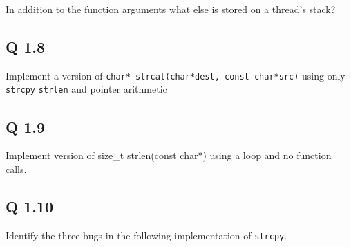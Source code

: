 In addition to the function arguments what else is stored on a thread's
stack?

\subsection{Q 1.8}\label{q-1.8}

Implement a version of
\texttt{char*\ strcat(char*dest,\ const\ char*src)} using only
\texttt{strcpy} \texttt{strlen} and pointer arithmetic

\begin{Shaded}
\begin{Highlighting}[]
 


   
\NormalTok{\}}
\end{Highlighting}
\end{Shaded}

\subsection{Q 1.9}\label{q-1.9}

Implement version of size\_t strlen(const char*) using a loop and no
function calls.

\begin{Shaded}
\begin{Highlighting}[]
 

\NormalTok{\}}
\end{Highlighting}
\end{Shaded}

\subsection{Q 1.10}\label{q-1.10}

Identify the three bugs in the following implementation of
\texttt{strcpy}.

\begin{Shaded}
\begin{Highlighting}[]
  
   
\NormalTok{\}}
\end{Highlighting}
\end{Shaded}

